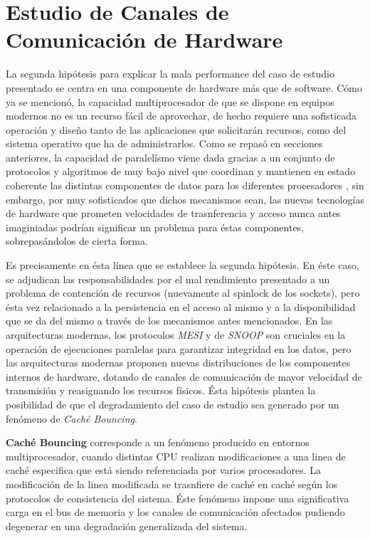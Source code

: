 \section{Estudio de Canales de Comunicación de Hardware}
La segunda hipótesis para explicar la mala performance del caso de estudio presentado se centra en una componente de hardware más que de software. Cómo ya se mencionó, la capacidad multiprocesador de que se dispone en equipos modernos no es un recurso fácil de aprovechar, de hecho requiere una sofisticada operación y diseño tanto de las aplicaciones que solicitarán recursos, como del sistema operativo que ha de administrarlos. Como se repasó en secciones anteriores, la capacidad de paralelísmo viene dada gracias a un conjunto de protocolos y algoritmos de muy bajo nivel que coordinan y mantienen en estado coherente las distintas componentes de datos para los diferentes procesadores \cite{paper:MESI, paper:snoop}, sin embargo, por muy sofisticados que dichos mecanismos sean, las nuevas tecnologías de hardware que prometen velocidades de trasnferencia y acceso nunca antes imaginiadas podrían significar un problema para éstas componentes, sobrepasándolos de cierta forma.

Es precisamente en ésta línea que se establece la segunda hipótesis. En éste caso, se adjudican las responsabilidades por el mal rendimiento presentado a un problema de contención de recursos (nuevamente al spinlock de los sockets), pero ésta vez relacionado a la persistencia en el acceso al mismo y a la disponibilidad que se da del mismo a través de los mecanismos antes mencionados. En las arquitecturas modernas, los protocolos \emph{MESI} y de \emph{SNOOP} son cruciales en la operación de ejecuciones paralelas para garantizar integridad en los datos, pero las arquitecturas modernas proponen nuevas distribuciones de los componentes internos de hardware, dotando de canales de comunicación de mayor velocidad de transmisión y reasignando los recursos físicos. Ésta hipótesis plantea la posibilidad de que el degradamiento del caso de estudio sea generado por un fenómeno de \emph{Caché Bouncing}.

\begin{defn} \textbf{Caché Bouncing} corresponde a un fenómeno producido en entornos multiprocesador, cuando distintas CPU realizan modificaciones a una linea de caché especifica que está siendo referenciada por varios procesadores. La modificación de la linea modificada se trasnfiere de caché en caché según los protocolos de consistencia del sistema. Éste fenómeno impone una significativa carga en el bus de memoria y los canales de comunicación afectados pudiendo degenerar en una degradación generalizada del sistema.
\end{defn}

